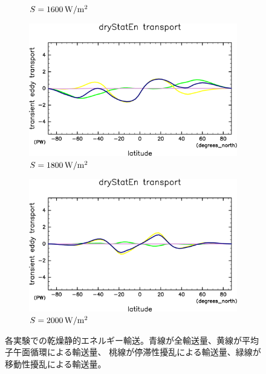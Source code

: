\documentclass[body]{subfiles}
\begin{document}
\begin{figure}[t]
\begin{subfigure}{.4\textwidth}
		\caption{\(S=1600\hmu{W/m^2}\)}
	\end{subfigure}
	\begin{subfigure}{.4\textwidth}
		\centering
		\includegraphics[width=\columnwidth]{S1800/MeriHeatTrans@dryStatEn,time=3650:4015-crop-rotate.pdf}
		\caption{\(S=1800\hmu{W/m^2}\)}
	\end{subfigure}
	\begin{subfigure}{.4\textwidth}
		\centering
		\includegraphics[width=\columnwidth]{S2000/MeriHeatTrans@dryStatEn,time=7300:7665-crop-rotate.pdf}
		\caption{\(S=2000\hmu{W/m^2}\)}
	\end{subfigure}
	\caption[各実験での乾燥静的エネルギー輸送]{
		各実験での乾燥静的エネルギー輸送。青線が全輸送量、黄線が平均子午面循環による輸送量、
		桃線が停滞性擾乱による輸送量、緑線が移動性擾乱による輸送量。
	}\label{乾燥静的エネルギー}
\end{figure}
\end{document}
